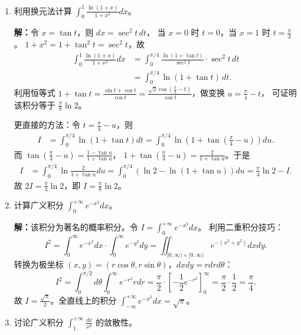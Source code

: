 \documentclass[12pt,a4paper]{ctexart}
\begin{document}
\begin{enumerate}[leftmargin=*,label=\arabic*.,start=20]
  \item 利用换元法计算 $\displaystyle\int_0^1 \frac{\ln(1+x)}{1+x^2} dx$。

    \textbf{解：}令 $x = \tan t$，则 $dx = \sec^2 t \, dt$，
    当 $x=0$ 时 $t=0$，当 $x=1$ 时 $t=\frac{\pi}{4}$。
    $1+x^2 = 1+\tan^2 t = \sec^2 t$，故
    \begin{align*}
      \int_0^1 \frac{\ln(1+x)}{1+x^2} dx
      &= \int_0^{\pi/4} \frac{\ln(1+\tan t)}{\sec^2 t} \cdot \sec^2 t \, dt \\
      &= \int_0^{\pi/4} \ln(1+\tan t) \, dt.
    \end{align*}
    利用恒等式 $1+\tan t = \frac{\sin t + \cos t}{\cos t}
    = \frac{\sqrt{2}\cos(\frac{\pi}{4}-t)}{\cos t}$，做变换 $u = \frac{\pi}{4}-t$，
    可证明该积分等于 $\frac{\pi}{8}\ln 2$。

    更直接的方法：令 $t = \frac{\pi}{4} - u$，则
    \begin{align*}
      I &= \int_0^{\pi/4} \ln(1+\tan t) dt
         = \int_0^{\pi/4} \ln(1+\tan(\tfrac{\pi}{4}-u)) du.
    \end{align*}
    而 $\tan(\frac{\pi}{4}-u) = \frac{1-\tan u}{1+\tan u}$，
    $1 + \tan(\frac{\pi}{4}-u) = \frac{2}{1+\tan u}$。于是
    \begin{align*}
      I &= \int_0^{\pi/4} \ln\frac{2}{1+\tan u} du
         = \int_0^{\pi/4} (\ln 2 - \ln(1+\tan u)) du
         = \frac{\pi}{4}\ln 2 - I.
    \end{align*}
    故 $2I = \frac{\pi}{4}\ln 2$，即 $I = \frac{\pi}{8}\ln 2$。

  \item 计算广义积分 $\displaystyle\int_0^{+\infty} e^{-x^2} dx$。

    \textbf{解：}该积分为著名的概率积分。令 $I = \int_0^{+\infty} e^{-x^2} dx$。
    利用二重积分技巧：
    \[
    I^2 = \int_0^{\infty} e^{-x^2} dx \cdot \int_0^{\infty} e^{-y^2} dy
        = \iint_{[0,\infty)\times[0,\infty)} e^{-(x^2+y^2)} dxdy.
    \]
    转换为极坐标 $(x,y) = (r\cos\theta, r\sin\theta)$，$dxdy = r dr d\theta$：
    \[
    I^2 = \int_0^{\pi/2} d\theta \int_0^{\infty} e^{-r^2} r dr
        = \frac{\pi}{2} \cdot \left[-\frac{1}{2}e^{-r^2}\right]_0^{\infty}
        = \frac{\pi}{2} \cdot \frac{1}{2}
        = \frac{\pi}{4}.
    \]
    故 $I = \frac{\sqrt{\pi}}{2}$。全直线上的积分 $\int_{-\infty}^{+\infty} e^{-x^2} dx = \sqrt{\pi}$。

  \item 讨论广义积分 $\displaystyle\int_1^{+\infty} \frac{dx}{x^p}$ 的敛散性。


\end{enumerate}
\end{document}
